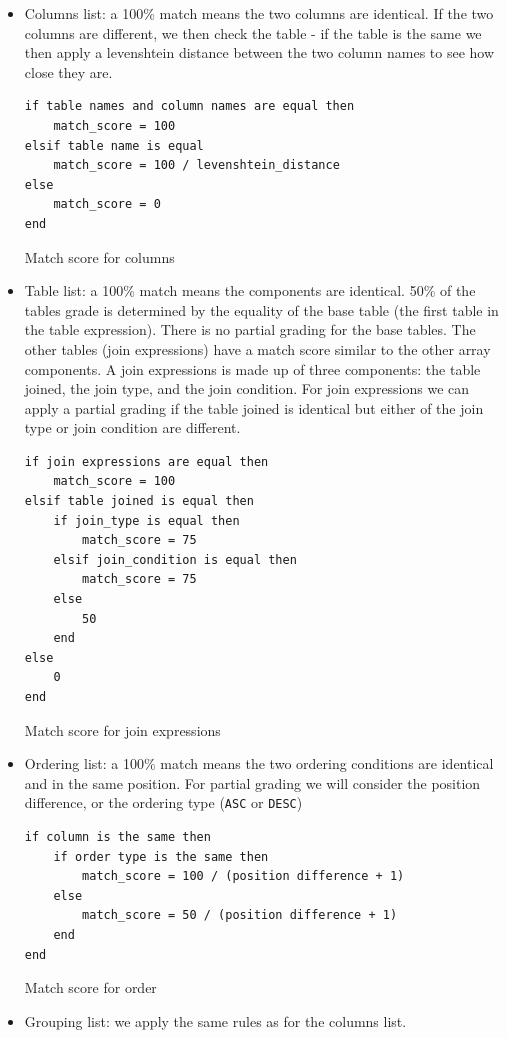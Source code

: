 \begin{itemize}
    \item Columns list: a 100\% match means the two columns are identical. If the two columns are different, we then check the table - if the table is the same we then apply a levenshtein distance between the two column names to see how close they are.
    \begin{code}
    \begin{verbatim}
if table names and column names are equal then
    match_score = 100
elsif table name is equal
    match_score = 100 / levenshtein_distance
else
    match_score = 0
end
    \end{verbatim}
    \caption{Match score for columns}
    \end{code}
    \item Table list: a 100\% match means the components are identical. 50\% of the tables grade is determined by the equality of the base table  (the first table in the table expression). There is no partial grading for the base tables. The other tables (join expressions) have a match score similar to the other array components. A join expressions is made up of three components: the table joined, the join type, and the join condition. For join expressions we can apply a partial grading if the table joined is identical but either of the join type or join condition are different.
    \begin{code}
    \begin{verbatim}
if join expressions are equal then
    match_score = 100
elsif table joined is equal then
    if join_type is equal then
        match_score = 75
    elsif join_condition is equal then
        match_score = 75
    else
        50
    end
else
    0
end
    \end{verbatim}
    \caption{Match score for join expressions}
    \end{code}
    \item Ordering list: a 100\% match means the two ordering conditions are identical and in the same position. For partial grading we will consider the position difference, or the ordering type (\texttt{ASC} or \texttt{DESC})
    \begin{code}
    
\begin{verbatim}
if column is the same then
    if order type is the same then
        match_score = 100 / (position difference + 1)
    else
        match_score = 50 / (position difference + 1)
    end
end
\end{verbatim}
\caption{Match score for order}
\end{code}
    \item Grouping list: we apply the same rules as for the columns list.
\end{itemize}


